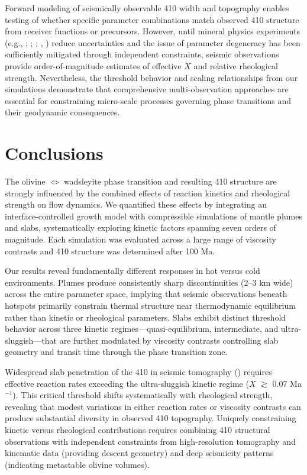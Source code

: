 \documentclass[
  paper=a4,
  ,captions=tableheading
]{scrartcl}
\begin{document}
Forward modeling of seismically observable 410 width and topography
enables testing of whether specific parameter combinations match
observed 410 structure from receiver functions or precursors. However,
until mineral physics experiments (e.g.,
;
;
;
,
) reduce uncertainties and the issue
of parameter degeneracy has been sufficiently mitigated through
independent constraints, seismic observations provide order-of-magnitude
estimates of effective \(\dot{X}\) and relative rheological strength.
Nevertheless, the threshold behavior and scaling relationships from our
simulations demonstrate that comprehensive multi-observation approaches
are essential for constraining micro-scale processes governing phase
transitions and their geodynamic consequences.

\section{Conclusions}\label{sec:conclusions}

The olivine \(\Leftrightarrow\) wadsleyite phase transition and
resulting 410 structure are strongly influenced by the combined effects
of reaction kinetics and rheological strength on flow dynamics. We
quantified these effects by integrating an interface-controlled growth
model with compressible simulations of mantle plumes and slabs,
systematically exploring kinetic factors spanning seven orders of
magnitude. Each simulation was evaluated across a large range of
viscosity contrasts and 410 structure was determined after 100 Ma.

Our results reveal fundamentally different responses in hot versus cold
environments. Plumes produce consistently sharp discontinuities (2--3 km
wide) across the entire parameter space, implying that seismic
observations beneath hotspots primarily constrain thermal structure near
thermodynamic equilibrium rather than kinetic or rheological parameters.
Slabs exhibit distinct threshold behavior across three kinetic
regimes---quasi-equilibrium, intermediate, and ultra-sluggish---that are
further modulated by viscosity contrasts controlling slab geometry and
transit time through the phase transition zone.

Widespread slab penetration of the 410 in seismic tomography
() requires effective
reaction rates exceeding the ultra-sluggish kinetic regime (\(\dot{X}\)
\(\gtrsim\) 0.07 Ma\(^{-1}\)). This critical threshold shifts
systematically with rheological strength, revealing that modest
variations in either reaction rates or viscosity contrasts can produce
substantial diversity in observed 410 topography. Uniquely constraining
kinetic versus rheological contributions requires combining 410
structural observations with independent constraints from
high-resolution tomography and kinematic data (providing descent
geometry) and deep seismicity patterns (indicating metastable olivine
volumes).
\end{document}
